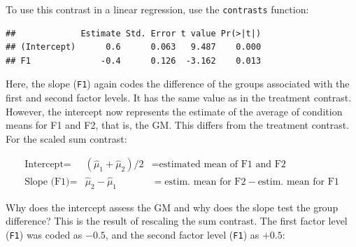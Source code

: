 \documentclass[
  12pt,
]{krantz}
\newenvironment{Shaded}{\begin{snugshade}}{\end{snugshade}}
\newcommand{\AttributeTok}[1]{\textcolor[rgb]{0.77,0.63,0.00}{#1}}
\newcommand{\DecValTok}[1]{\textcolor[rgb]{0.00,0.00,0.81}{#1}}
\newcommand{\FloatTok}[1]{\textcolor[rgb]{0.00,0.00,0.81}{#1}}
\newcommand{\FunctionTok}[1]{\textcolor[rgb]{0.00,0.00,0.00}{#1}}
\newcommand{\NormalTok}[1]{#1}
\newcommand{\OtherTok}[1]{\textcolor[rgb]{0.56,0.35,0.01}{#1}}
\newcommand{\SpecialCharTok}[1]{\textcolor[rgb]{0.00,0.00,0.00}{#1}}
\theoremstyle{definition}
\theoremstyle{definition}
\theoremstyle{definition}
\theoremstyle{definition}
\theoremstyle{remark}
\begin{document}
To use this contrast in a linear regression, use the \texttt{contrasts} function:

\begin{Shaded}
\end{Shaded}

\begin{Shaded}
\end{Shaded}

\begin{verbatim}
##             Estimate Std. Error t value Pr(>|t|)
## (Intercept)      0.6      0.063   9.487    0.000
## F1              -0.4      0.126  -3.162    0.013
\end{verbatim}

Here, the slope (\texttt{F1}) again codes the difference of the groups associated with the first and second factor levels. It has the same value as in the treatment contrast.
However, the intercept now represents the estimate of the average of condition means for F1 and F2, that is, the GM. This differs from the treatment contrast. For the scaled sum contrast:

\begin{equation}
\begin{array}{lcl}
\text{Intercept} = & (\hat{\mu}_1 + \hat{\mu}_2)/2 & = \text{estimated mean of F1 and F2} \\
\text{Slope (F1)} = & \hat{\mu}_2 - \hat{\mu}_1 & = \text{estim. mean for F2} - \text{estim. mean for F1} 
\end{array}
\label{def:beta2}
\end{equation}

Why does the intercept assess the GM and why does the slope test the group difference? This is the result of rescaling the sum contrast. The first factor level (\texttt{F1}) was coded as \(-0.5\), and the second factor level (\texttt{F1}) as \(+0.5\):
\end{document}
